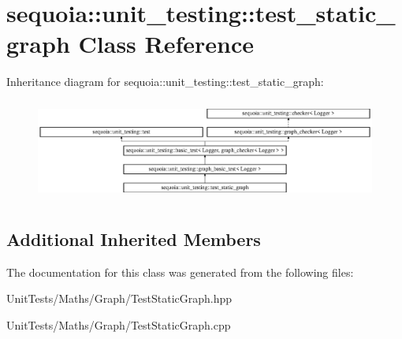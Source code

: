 \hypertarget{classsequoia_1_1unit__testing_1_1test__static__graph}{}\section{sequoia\+::unit\+\_\+testing\+::test\+\_\+static\+\_\+graph Class Reference}
\label{classsequoia_1_1unit__testing_1_1test__static__graph}
Inheritance diagram for sequoia\+::unit\+\_\+testing\+::test\+\_\+static\+\_\+graph\+:\begin{figure}[H]
\begin{center}
\leavevmode
\includegraphics[height=3.357314cm]{classsequoia_1_1unit__testing_1_1test__static__graph}
\end{center}
\end{figure}
\subsection*{Additional Inherited Members}


The documentation for this class was generated from the following files\+:\begin{DoxyCompactItemize}
\item 
Unit\+Tests/\+Maths/\+Graph/Test\+Static\+Graph.\+hpp\item 
Unit\+Tests/\+Maths/\+Graph/Test\+Static\+Graph.\+cpp\end{DoxyCompactItemize}
